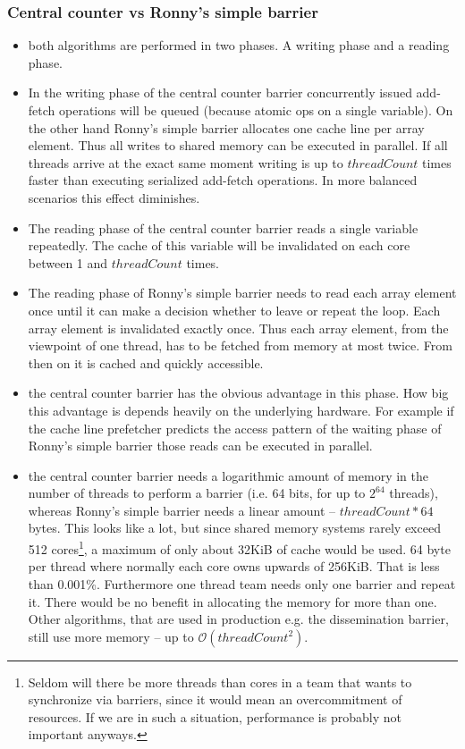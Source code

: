 \documentclass[a4paper, 10pt]{article}
\begin{document}
\subsubsection{Central counter vs Ronny's simple barrier}
\begin{itemize}
	\item both algorithms are performed in two phases. A writing phase and a reading phase.
	\item In the writing phase of the central counter barrier concurrently issued add-fetch operations will be queued (because atomic ops on a single variable). On the other hand Ronny's simple barrier allocates one cache line per array element. Thus all writes to shared memory can be executed in parallel. If all threads arrive at the exact same moment writing is up to $threadCount$ times faster than executing serialized add-fetch operations. In more balanced scenarios this effect diminishes.
	\item The reading phase of the central counter barrier reads a single variable repeatedly. The cache of this variable will be invalidated on each core between 1 and $threadCount$ times.
	\item The reading phase of Ronny's simple barrier needs to read each array element once until it can make a decision whether to leave or repeat the loop. Each array element is invalidated exactly once. Thus each array element, from the viewpoint of one thread, has to be fetched from memory at most twice. From then on it is cached and quickly accessible.
	\item the central counter barrier has the obvious advantage in this phase. How big this advantage is depends heavily on the underlying hardware. For example if the cache line prefetcher predicts the access pattern of the waiting phase of Ronny's simple barrier those reads can be executed in parallel.
	\item the central counter barrier needs a logarithmic amount of memory in the number of threads to perform a barrier (i.e. 64 bits, for up to $2^{64}$ threads), whereas Ronny's simple barrier needs a linear amount -- $threadCount*64$ bytes. This looks like a lot, but since shared memory systems rarely exceed 512 cores\footnote{Seldom will there be more threads than cores in a team that wants to synchronize via barriers, since it would mean an overcommitment of resources. If we are in such a situation, performance is probably not important anyways.}, a maximum of only about 32KiB of cache would be used. 64 byte per thread where normally each core owns upwards of 256KiB. That is less than 0.001\%. Furthermore one thread team needs only one barrier and repeat it. There would be no benefit in allocating the memory for more than one. Other algorithms, that are used in production e.g. the dissemination barrier, still use more memory -- up to $\mathcal{O}(threadCount^2)$.
\end{itemize}
\end{document}
